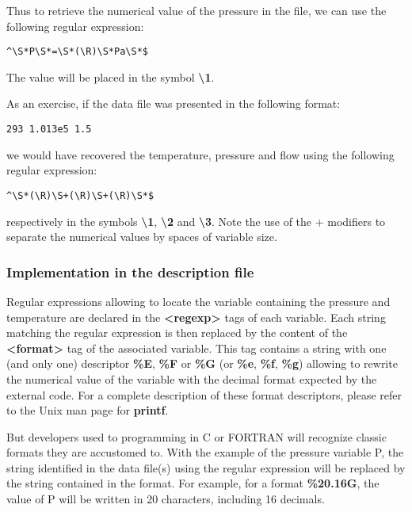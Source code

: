 Thus to retrieve the numerical value of the pressure in the file, we can use the following regular expression:
\lstset{language=C++, basicstyle=\normalsize}
\begin{lstlisting}[frame=TBRL]
  ^\S*P\S*=\S*(\R)\S*Pa\S*$
\end{lstlisting}

The value will be placed in the symbol {\bf \textbackslash 1}.

As an exercise, if the data file was presented in the following format:
\lstset{language=C++, basicstyle=\normalsize}
\begin{lstlisting}[frame=TBRL]
  293 1.013e5 1.5
\end{lstlisting}
we would have recovered the temperature, pressure and flow using the following regular expression:
\lstset{language=C++, basicstyle=\normalsize}
\begin{lstlisting}[frame=TBRL]
  ^\S*(\R)\S+(\R)\S+(\R)\S*$
\end{lstlisting}

respectively in the symbols {\bf \textbackslash 1}, {\bf \textbackslash 2} and {\bf \textbackslash 3}. Note the use of the + modifiers to separate the numerical values by spaces of variable size.

\subsubsection{Implementation in the description file}

Regular expressions allowing to locate the variable containing the pressure and temperature are declared in the {\bf <regexp>} tags of each variable. Each string matching the regular expression is then replaced by the content of the {\bf <format>} tag of the associated variable. This tag contains a string with one (and only one) descriptor {\bf \%E}, {\bf \%F} or {\bf \%G} (or {\bf \%e}, {\bf \%f}, {\bf \%g}) allowing to rewrite the numerical value of the variable with the decimal format expected by the external code. For a complete description of these format descriptors, please refer to the Unix man page for {\bf printf}.

But developers used to programming in C or FORTRAN will recognize classic formats they are accustomed to. With the example of the pressure variable P, the string identified in the data file(s) using the regular expression will be replaced by the string contained in the format. For example, for a format {\bf \%20.16G}, the value of P will be written in 20 characters, including 16 decimals.

